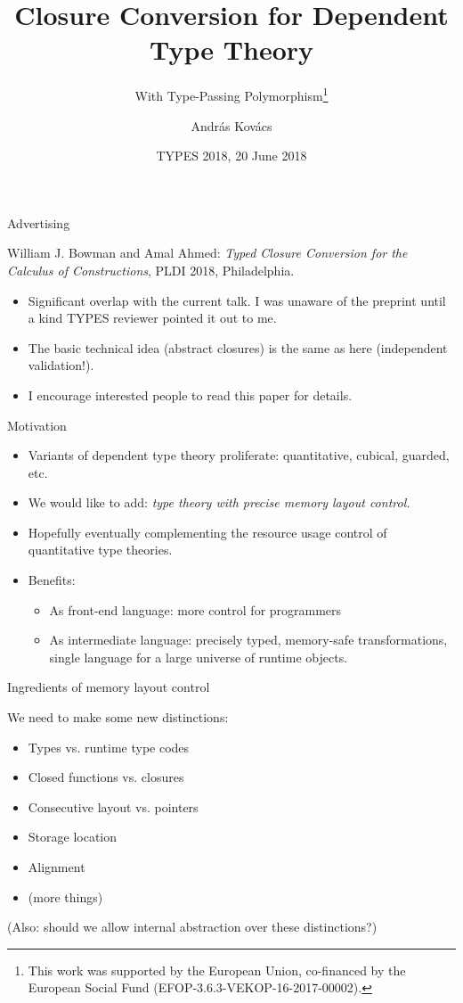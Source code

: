 \documentclass{beamer}
\title{Closure Conversion for Dependent Type Theory}
\subtitle{With Type-Passing Polymorphism\thanks{This work was supported by the European Union, co-financed by the European
Social Fund (EFOP-3.6.3-VEKOP-16-2017-00002).}}
\author{András Kovács}
\institute{Eötvös Loránd University, Budapest}
\date{TYPES 2018, 20 June 2018}
\begin{document}
\frame{\titlepage}


\begin{frame}{Advertising}


William J. Bowman and Amal Ahmed: \emph{Typed Closure Conversion for the Calculus of Constructions}, PLDI 2018, Philadelphia.

\begin{itemize}
\item
Significant overlap with the current talk. I was unaware of the
preprint until a kind TYPES reviewer pointed it out to me.
\item
The basic technical idea (abstract closures) is the same as here (independent validation!).
\item
I encourage interested people to read this paper for details.
\end{itemize}

\end{frame}

\begin{frame}{Motivation}
  \begin{itemize}
  \item
    Variants of dependent type theory proliferate: quantitative, cubical, guarded, etc.
  \item
    We would like to add: \emph{type theory with precise memory layout control.}
  \item
    Hopefully eventually complementing the resource usage control of quantitative
    type theories.
  \item Benefits:
    \begin{itemize}
    \item As front-end language: more control for programmers
    \item As intermediate language: precisely typed, memory-safe transformations,
          single language for a large universe of runtime objects.
    \end{itemize}
  \end{itemize}
\end{frame}

\begin{frame}{Ingredients of memory layout control}

  We need to make some new distinctions:

  \begin{itemize}
  \item Types vs. runtime type codes
  \item Closed functions vs. closures
  \item Consecutive layout vs. pointers
  \item Storage location
  \item Alignment
  \item (more things)
  \end{itemize}
(Also: should we allow internal abstraction over these distinctions?)
\end{frame}
\end{document}
